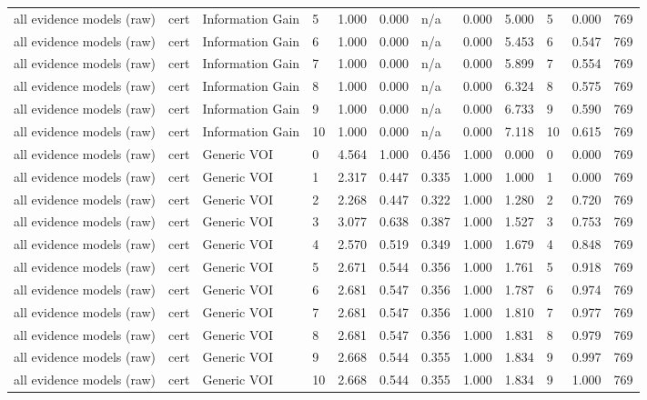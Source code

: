\begin{table}[!ht]
{\begin{tabular}{llllllllllll}
all evidence models (raw) & cert & Information Gain & 5 & 1.000 & 0.000 & n/a & 0.000 & 5.000 & 5 & 0.000 & 769 \\
all evidence models (raw) & cert & Information Gain & 6 & 1.000 & 0.000 & n/a & 0.000 & 5.453 & 6 & 0.547 & 769 \\
all evidence models (raw) & cert & Information Gain & 7 & 1.000 & 0.000 & n/a & 0.000 & 5.899 & 7 & 0.554 & 769 \\
all evidence models (raw) & cert & Information Gain & 8 & 1.000 & 0.000 & n/a & 0.000 & 6.324 & 8 & 0.575 & 769 \\
all evidence models (raw) & cert & Information Gain & 9 & 1.000 & 0.000 & n/a & 0.000 & 6.733 & 9 & 0.590 & 769 \\
all evidence models (raw) & cert & Information Gain & 10 & 1.000 & 0.000 & n/a & 0.000 & 7.118 & 10 & 0.615 & 769 \\
all evidence models (raw) & cert & Generic VOI & 0 & 4.564 & 1.000 & 0.456 & 1.000 & 0.000 & 0 & 0.000 & 769 \\
all evidence models (raw) & cert & Generic VOI & 1 & 2.317 & 0.447 & 0.335 & 1.000 & 1.000 & 1 & 0.000 & 769 \\
all evidence models (raw) & cert & Generic VOI & 2 & 2.268 & 0.447 & 0.322 & 1.000 & 1.280 & 2 & 0.720 & 769 \\
all evidence models (raw) & cert & Generic VOI & 3 & 3.077 & 0.638 & 0.387 & 1.000 & 1.527 & 3 & 0.753 & 769 \\
all evidence models (raw) & cert & Generic VOI & 4 & 2.570 & 0.519 & 0.349 & 1.000 & 1.679 & 4 & 0.848 & 769 \\
all evidence models (raw) & cert & Generic VOI & 5 & 2.671 & 0.544 & 0.356 & 1.000 & 1.761 & 5 & 0.918 & 769 \\
all evidence models (raw) & cert & Generic VOI & 6 & 2.681 & 0.547 & 0.356 & 1.000 & 1.787 & 6 & 0.974 & 769 \\
all evidence models (raw) & cert & Generic VOI & 7 & 2.681 & 0.547 & 0.356 & 1.000 & 1.810 & 7 & 0.977 & 769 \\
all evidence models (raw) & cert & Generic VOI & 8 & 2.681 & 0.547 & 0.356 & 1.000 & 1.831 & 8 & 0.979 & 769 \\
all evidence models (raw) & cert & Generic VOI & 9 & 2.668 & 0.544 & 0.355 & 1.000 & 1.834 & 9 & 0.997 & 769 \\
all evidence models (raw) & cert & Generic VOI & 10 & 2.668 & 0.544 & 0.355 & 1.000 & 1.834 & 9 & 1.000 & 769 \\

\end{tabular}}
\end{table}
